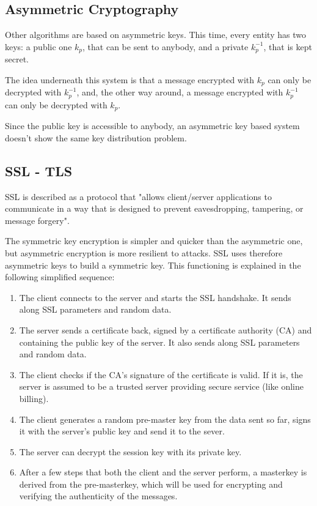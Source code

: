 \subsection{Asymmetric Cryptography}
Other algorithms are based on asymmetric keys. This time, every entity has two keys: a public one $k_{p}$, that can be sent to anybody, and a private $ k_{p}^{-1} $, that is kept secret.

The idea underneath this system is that a message encrypted with $k_{p}$ can only be decrypted with $ k_{p}^{-1} $, and, the other way around, a message encrypted with $ k_{p}^{-1} $ can only be decrypted with $k_{p}$.

Since the public key is accessible to anybody, an asymmetric key based system doesn't show the same key distribution problem.

\subsection{SSL - TLS}
SSL is described\cite{freier2011secure} as a protocol that "allows client/server applications to communicate in a way that is designed to prevent eavesdropping, tampering, or message forgery".

The symmetric key encryption is simpler and quicker than the asymmetric one, but asymmetric encryption is more resilient to attacks. SSL uses therefore asymmetric keys to build a symmetric key. This functioning is explained in the following simplified sequence:

\begin{enumerate}
	\item The client connects to the server and starts the SSL handshake. It sends along SSL parameters and random data.
	\item The server sends a certificate back, signed by a certificate authority (CA) and containing the public key of the server. It also sends along SSL parameters and random data.
	\item The client checks if the CA's signature of the certificate is valid. If it is, the server is assumed to be a trusted server providing secure service (like online billing).
	\item The client generates a random pre-master key from the data sent so far, signs it with the server's public key and send it to the sever.
	\item The server can decrypt the session key with its private key. 
	\item After a few steps that both the client and the server perform, a masterkey is derived from the pre-masterkey, which will be used for encrypting and verifying the authenticity of the messages.
\end{enumerate}

